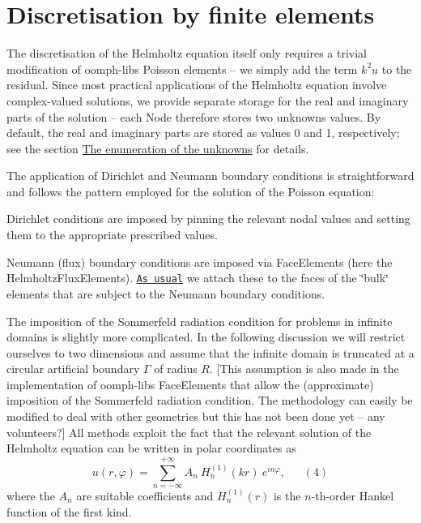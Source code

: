 

\hypertarget{index_discr}{}\section{Discretisation by finite elements}\label{index_discr}
The discretisation of the Helmholtz equation itself only requires a trivial modification of {\ttfamily oomph-\/lib\textquotesingle{}s} Poisson elements -- we simply add the term $ k^2 u $ to the residual. Since most practical applications of the Helmholtz equation involve complex-\/valued solutions, we provide separate storage for the real and imaginary parts of the solution -- each {\ttfamily Node} therefore stores two unknowns values. By default, the real and imaginary parts are stored as values 0 and 1, respectively; see the section \hyperlink{index_numbering}{The enumeration of the unknowns} for details.

The application of Dirichlet and Neumann boundary conditions is straightforward and follows the pattern employed for the solution of the Poisson equation\+:
\begin{DoxyItemize}
\item Dirichlet conditions are imposed by pinning the relevant nodal values and setting them to the appropriate prescribed values.
\item Neumann (flux) boundary conditions are imposed via {\ttfamily Face\+Elements} (here the {\ttfamily Helmholtz\+Flux\+Elements}). \href{../../../poisson/two_d_poisson_flux_bc/html/index.html}{\tt As usual} we attach these to the faces of the \char`\"{}bulk\char`\"{} elements that are subject to the Neumann boundary conditions.
\end{DoxyItemize}The imposition of the Sommerfeld radiation condition for problems in infinite domains is slightly more complicated. In the following discussion we will restrict ourselves to two dimensions and assume that the infinite domain is truncated at a circular artificial boundary $ \Gamma $ of radius $ R. $ \mbox{[}This assumption is also made in the implementation of {\ttfamily oomph-\/lib\textquotesingle{}s} {\ttfamily Face\+Elements} that allow the (approximate) imposition of the Sommerfeld radiation condition. The methodology can easily be modified to deal with other geometries but this has not been done yet -- any volunteers?\mbox{]} All methods exploit the fact that the relevant solution of the Helmholtz equation can be written in polar coordinates as \[ u(r,\varphi) = \sum_{n=-\infty}^{+\infty} A_n \ H_n^{(1)}(kr) \ e^{i n \varphi}, \ \ \ \ \ \ \ (4) \] where the $A_n $ are suitable coefficients and $ H_n^{(1)}(r) $ is the $ n $-\/th-\/order Hankel function of the first kind.



